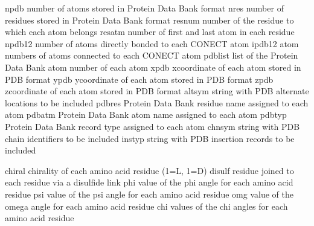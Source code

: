 \documentclass[letterpaper,11pt,english]{sphinxmanual}
\begin{document}

\begin{sphinxVerbatim}[commandchars=\\\{\}]
npdb            number of atoms stored in Protein Data Bank format
nres            number of residues stored in Protein Data Bank format
resnum          number of the residue to which each atom belongs
resatm          number of first and last atom in each residue
npdb12          number of atoms directly bonded to each CONECT atom
ipdb12          atom numbers of atoms connected to each CONECT atom
pdblist         list of the Protein Data Bank atom number of each atom
xpdb            x\PYGZhy{}coordinate of each atom stored in PDB format
ypdb            y\PYGZhy{}coordinate of each atom stored in PDB format
zpdb            z\PYGZhy{}coordinate of each atom stored in PDB format
altsym          string with PDB alternate locations to be included
pdbres          Protein Data Bank residue name assigned to each atom
pdbatm          Protein Data Bank atom name assigned to each atom
pdbtyp          Protein Data Bank record type assigned to each atom
chnsym          string with PDB chain identifiers to be included
instyp          string with PDB insertion records to be included
\end{sphinxVerbatim}


\begin{sphinxVerbatim}[commandchars=\\\{\}]
chiral          chirality of each amino acid residue (1=L, \PYGZhy{}1=D)
disulf          residue joined to each residue via a disulfide link
phi             value of the phi angle for each amino acid residue
psi             value of the psi angle for each amino acid residue
omg             value of the omega angle for each amino acid residue
chi             values of the chi angles for each amino acid residue
\end{sphinxVerbatim}

\end{document}
